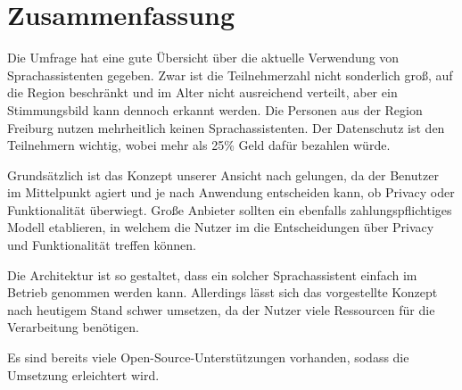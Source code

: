 \section{Zusammenfassung}

Die Umfrage hat eine gute Übersicht über die aktuelle Verwendung von Sprachassistenten gegeben. Zwar ist die Teilnehmerzahl nicht sonderlich groß, auf die Region beschränkt und im Alter nicht ausreichend verteilt, aber ein Stimmungsbild kann dennoch erkannt werden. Die Personen aus der Region Freiburg nutzen mehrheitlich keinen Sprachassistenten. Der Datenschutz ist den Teilnehmern wichtig, wobei mehr als 25\% Geld dafür bezahlen würde. 

 Grundsätzlich ist das Konzept unserer Ansicht nach gelungen, da der Benutzer im Mittelpunkt agiert und je nach Anwendung entscheiden kann, ob Privacy oder Funktionalität überwiegt. Große Anbieter sollten ein ebenfalls zahlungspflichtiges Modell etablieren, in welchem die Nutzer im die Entscheidungen über Privacy und Funktionalität treffen können. 

Die Architektur ist so gestaltet, dass ein solcher Sprachassistent einfach im Betrieb genommen werden kann. Allerdings lässt sich das vorgestellte Konzept nach heutigem Stand schwer umsetzen, da der Nutzer viele Ressourcen für die Verarbeitung benötigen. 

Es sind bereits viele Open-Source-Unterstützungen vorhanden, sodass die Umsetzung erleichtert wird. 